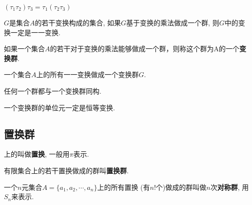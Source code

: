 \begin{Theorem}[变换乘法结合]
$(\tau_1 \tau_2) \tau_3 = \tau_1 ( \tau_2 \tau_3 )$
\end{Theorem}

\begin{Theorem}
$G$是集合$A$的若干变换构成的集合, 如果$G$基于变换的乘法做成一个群,
则$G$中的变换一定是一一变换.
\end{Theorem}

\begin{Definition}[变换群]
如果一个集合$A$的若干\;\;对于变换的乘法能够做成一个群，则称这个群为A的一个\textbf{变换群}.
\end{Definition}

\begin{Theorem}
一个集合$A$上的所有一一变换做成一个变换群$G$.
\end{Theorem}

\begin{Theorem}
任何一个群都与一个变换群同构.
\end{Theorem}

\begin{Theorem}
一个变换群的单位元一定是恒等变换.
\end{Theorem}

\subsection{置换群}

\begin{Definition}[置换]
\;上的\;\;叫做\textbf{置换}, 一般用$\pi$表示.
\end{Definition}

\begin{Definition}[置换群]
有限集合上的若干置换做成的群叫\textbf{置换群}.
\end{Definition}

\begin{Definition}[对称群]
一个$n$元集合$A = \{ a_1, a_2, \cdots, a_n \}$上的所有置换
(有$n!$个)做成的群叫做$n$次\textbf{对称群}, 用$S_n$来表示.
\end{Definition}

